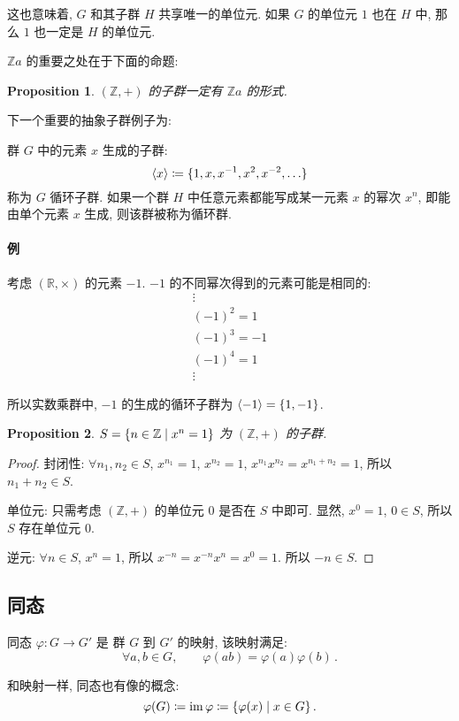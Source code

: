 \documentclass[UTF8]{ctexart}
\theoremstyle{mystyle}
\newtheorem{proposition}{Proposition}[section]
\theoremstyle{myremark}
\theoremstyle{plain}
\newcommand{\R}{\mathbb R}
\newcommand{\Z}{\mathbb Z}
\DeclareMathOperator{\im}{im}
\DeclarePairedDelimiter\set{\{}{\}}
\begin{document}
这也意味着, $ G $ 和其子群 $ H $ 共享唯一的单位元. 如果 $ G $ 的单位元 $ 1 $ 也在 $ H $ 中, 那么 $ 1 $ 也一定是 $ H $ 的单位元.

$ \Z a $ 的重要之处在于下面的命题:
\begin{proposition}
    $ (\Z, +) $ 的子群一定有 $ \Z a $ 的形式.
\end{proposition}


下一个重要的抽象子群例子为:
\begin{definition}
    群 $ G $ 中的元素 $ x $ 生成的子群: 
    \[ \langle x \rangle \coloneqq \set{1, x, x^{-1}, x^2, x^{-2}, \dots} \]
    称为 $ G $ 循环子群. 如果一个群 $ H $ 中任意元素都能写成某一元素 $ x $ 的幂次 $ x^n $, 即能由单个元素 $ x $ 生成, 则该群被称为循环群.
\end{definition}

\paragraph{例}
考虑 $ (\R, \times) $ 的元素 $ -1 $. $ -1 $ 的不同幂次得到的元素可能是相同的:
\[ \begin{array}{c}
    \vdots \\
    (-1)^2 = 1 \\
    (-1)^3 = -1 \\
    (-1)^4 = 1 \\
    \vdots
\end{array} \]

所以实数乘群中, $ -1 $ 的生成的循环子群为 $ \langle -1 \rangle = \set{1, -1} $.


\begin{proposition}
    $ S = \set{n \in \Z \mid x^n = 1} $ 为 $ (\Z, +) $ 的子群.
\end{proposition}

\begin{proof}
    封闭性: $ \forall n_1, n_2 \in S $, $ x^{n_1} = 1 $, $ x^{n_2} = 1 $, $ x^{n_1} x^{n_2} = x^{n_1 + n_2} = 1 $, 所以 $ n_1 + n_2 \in S $.

    单位元: 只需考虑 $ (\Z, +) $ 的单位元 $ 0 $ 是否在 $ S $ 中即可. 显然, $ x^0 = 1 $, $ 0 \in S $, 所以 $ S $ 存在单位元 $ 0 $.

    逆元: $ \forall n \in S $, $ x^n = 1 $, 所以 $ x^{-n} = x^{-n} x^n = x^0 = 1 $. 所以 $ -n \in S $.
\end{proof}


\subsection{同态}
\begin{definition}
    同态 $ \varphi \colon G \to G' $ 是 群 $ G $ 到 $ G' $ 的映射, 该映射满足:
    \[ \forall a, b \in G, \qquad \varphi(a b) = \varphi(a) \varphi(b) \,.\]

    和映射一样, 同态也有像的概念:
    \[ \varphi(G) \coloneqq \im \varphi \coloneqq \set{\varphi(x) \mid x \in G} \,.\]
\end{definition}
\end{document}
